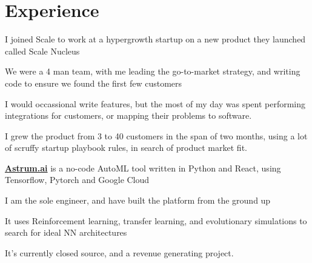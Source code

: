 \documentclass[]{deedy-resume-openfont}
\begin{document}
\begin{minipage}[t]{0.66\textwidth} 


\section{Experience}

\vspace{\topsep} %
\begin{tightemize}
\item I joined Scale to work at a hypergrowth startup on a new product they launched called Scale Nucleus
\item We were a 4 man team, with me leading the go-to-market strategy, and writing code to ensure we found the first few customers
\item I would occassional write features, but the most of my day was spent performing integrations for customers, or mapping their problems to software.
\item I grew the product from 3 to 40 customers in the span of two months, using a lot of scruffy startup playbook rules, in search of product market fit.
\end{tightemize}
\sectionsep

\vspace{\topsep} %
\begin{tightemize}
\item \textbf{\href{https://www.astrum.ai}{Astrum.ai}} is a no-code AutoML tool written in Python and React, using Tensorflow, Pytorch and Google Cloud
\item I am the sole engineer, and have built the platform from the ground up
\item It uses Reinforcement learning, transfer learning, and evolutionary simulations to search for ideal NN architectures
\item It's currently closed source, and a revenue generating project.
\end{tightemize}
\sectionsep


\end{minipage}
\end{document}
